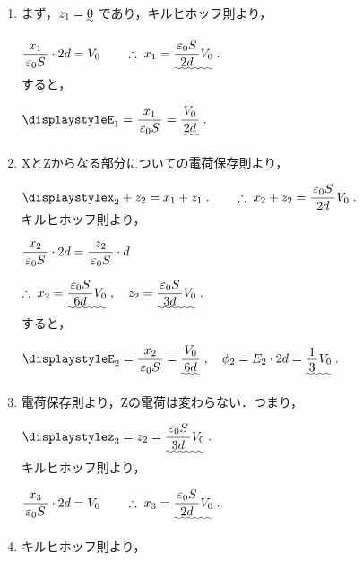 ﻿\documentclass[../../../ps_a.tex]{subfiles}
\begin{document}
    \begin{enumerate}
        \item まず，$z_1 = \uwave{0}$ であり，キルヒホッフ則より，
            
            \myspaceb%
            $\displaystyle%
                \myfracc{x_1}{\varepsilon_0 S} \cdot 2d = V_0%
                \qquad \therefore \; x_1%
                = \uwave{\myfracc{\varepsilon_0 S}{2d} V_0} \;.
            $\\
            すると，
            
            \myspaceb%
            $\displaystyle%
                E_1 = \myfracc{x_1}{\varepsilon_0 S}%
                = \uwave{\myfracc{V_0}{2d}} \;.
            $            
        \item XとZからなる部分についての電荷保存則より，
            
            \myspaceb%
            $\displaystyle%
                x_2 + z_2 = x_1 + z_1 \;.%
                \qquad \therefore \; x_2 + z_2 =%
                \myfracc{\varepsilon_0 S}{2d} V_0 \;.
            $\\
            キルヒホッフ則より，
            
            \myspaceb%
            $\displaystyle%
                \myfracc{x_2}{\varepsilon_0 S} \cdot 2d%
                = \myfracc{z_2}{\varepsilon_0 S} \cdot d
            $

            \myspaceb%
            $\displaystyle%
                \therefore \; x_2%
                =\uwave{\myfracc{\varepsilon_0 S}{6d} V_0} \;,%
                \quad z_2 = \uwave{\myfracc{\varepsilon_0 S}{3d} V_0} \;.
            $\\
            すると，
            
            \myspaceb%
            $\displaystyle%
                E_2 = \myfracc{x_2}{\varepsilon_0 S}%
                = \uwave{\myfracc{V_0}{6d}} \;,  %
                \quad \phi_2 = E_2 \cdot 2d = \uwave{\myfraca{1}{3} V_0} \;.
            $
        \item 電荷保存則より，Zの電荷は変わらない．つまり，
            
            \myspaceb%
            $\displaystyle%
                z_3 = z_2 = \uwave{\myfracc{\varepsilon_0 S}{3d} V_0} \;.
            $\\
            キルヒホッフ則より，
            
            \myspaceb%
            $\displaystyle%
                \myfracc{x_3}{\varepsilon_0 S} \cdot 2d = V_0%
                \qquad \therefore \; x_3%
                = \uwave{\myfracc{\varepsilon_0 S}{2d} V_0} \;.
            $
        \item キルヒホッフ則より，
            

\end{enumerate}
\end{document}
